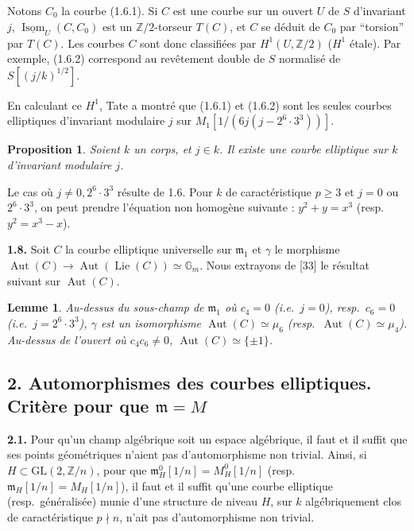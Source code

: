 \documentclass[10pt,a4paper]{amsart}
\theoremstyle{plain}
\newtheorem{lemma}[theorem]{Lemme}
\newtheorem{proposition}[theorem]{Proposition}
\theoremstyle{definition}
\DeclareMathOperator{\Isom}{Isom}
\DeclareMathOperator{\Aut}{Aut}
\newcommand{\m}{\mathfrak{m}}
\newcommand{\ZZ}{\mathbb{Z}}
\newcommand{\GG}{\mathbb{G}}
\newcommand{\GL}{\mathrm{GL}}
\DeclareMathOperator{\Lie}{Lie}
\begin{document}
Notons $C_0$ la courbe (1.6.1). Si $C$ est une courbe sur un ouvert $U$ de $S$ d'invariant $j$, $\underline{\Isom}_U(C, C_0)$ est un $\ZZ/2$-torseur $T(C)$, et $C$ se d\'eduit de $C_0$ par ``torsion'' par $T(C)$. Les courbes $C$ sont donc classifi\'ees par $H^1(U, \ZZ/2)$ ($H^1$ \'etale). Par exemple, (1.6.2) correspond au rev\^etement double de $S$ normalis\'e de $S[(j/k)^{1/2}]$.

En calculant ce $H^1$, Tate a montr\'e que (1.6.1) et (1.6.2) sont les seules courbes elliptiques d'invariant modulaire $j$ sur $M_1[1/(6j(j-2^6 \cdot 3^3))]$.

\setcounter{theorem}{6}
\begin{proposition}
Soient $k$ un corps, et $j \in k$. Il existe une courbe elliptique sur $k$ d'invariant modulaire $j$.
\end{proposition}

Le cas o\`u $j \not= 0, 2^6 \cdot 3^3$ r\'esulte de 1.6. Pour $k$ de caract\'eristique $p \ge 3$ et $j = 0$ ou $2^6 \cdot 3^3$, on peut prendre l'\'equation non homog\`ene suivante : $y^2 + y = x^3$ (resp.\ $y^2 = x^3 - x$).

\medskip\noindent\textbf{1.8.} Soit $C$ la courbe elliptique universelle sur $\m_1$ et $\gamma$ le morphisme $\Aut(C) \to \Aut(\Lie(C)) \simeq \GG_m$. Nous extrayons de [33] le r\'esultat suivant sur $\Aut(C)$.

\setcounter{theorem}{8}
\begin{lemma}
Au-dessus du sous-champ de $\m_1$ o\`u $c_4 = 0$ (i.e.\ $j = 0$), resp.\ $c_6 = 0$ (i.e.\ $j = 2^6 \cdot 3^3$), $\gamma$ est un isomorphisme $\Aut(C) \simeq \mu_6$ (resp.\ $\Aut(C) \simeq \mu_4$). Au-dessus de l'ouvert o\`u $c_4 c_6 \not= 0$, $\Aut(C) \simeq \{\pm 1\}$.
\end{lemma}


\subsection*{2. Automorphismes des courbes elliptiques. Crit\`ere pour que $\m = M$}

\setcounter{theorem}{0}
\setcounter{subsection}{1}
\setcounter{theorem}{0}

\medskip\noindent\textbf{2.1.} Pour qu'un champ alg\'ebrique soit un espace alg\'ebrique, il faut et il suffit que ses points g\'eom\'etriques n'aient pas d'automorphisme non trivial. Ainsi, si $H \subset \GL(2,\ZZ/n)$, pour que $\m_H^0[1/n] = M_H^0[1/n]$ (resp.\ $\m_H[1/n] = M_H[1/n]$), il faut et il suffit qu'une courbe elliptique (resp.\ g\'en\'eralis\'ee) munie d'une structure de niveau $H$, sur $k$ alg\'ebriquement clos de caract\'eristique $p \nmid n$, n'ait pas d'automorphisme non trivial.
\end{document}
